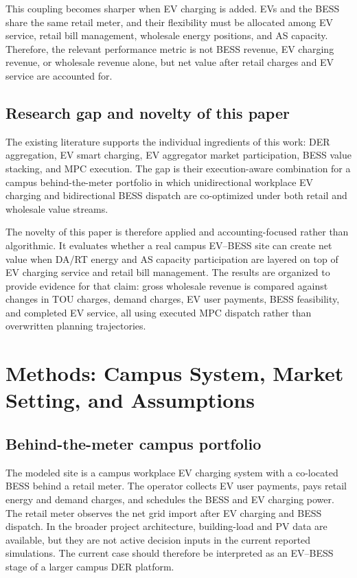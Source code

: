 \documentclass[final,5p,times]{elsarticle}
\begin{document}
This coupling becomes sharper when EV charging is added. EVs and the BESS share the same retail meter, and their flexibility must be allocated among EV service, retail bill management, wholesale energy positions, and AS capacity. Therefore, the relevant performance metric is not BESS revenue, EV charging revenue, or wholesale revenue alone, but net value after retail charges and EV service are accounted for.

\subsection{Research gap and novelty of this paper}
The existing literature supports the individual ingredients of this work: DER aggregation, EV smart charging, EV aggregator market participation, BESS value stacking, and MPC execution. The gap is their execution-aware combination for a campus behind-the-meter portfolio in which unidirectional workplace EV charging and bidirectional BESS dispatch are co-optimized under both retail and wholesale value streams.

The novelty of this paper is therefore applied and accounting-focused rather than algorithmic. It evaluates whether a real campus EV--BESS site can create net value when DA/RT energy and AS capacity participation are layered on top of EV charging service and retail bill management. The results are organized to provide evidence for that claim: gross wholesale revenue is compared against changes in TOU charges, demand charges, EV user payments, BESS feasibility, and completed EV service, all using executed MPC dispatch rather than overwritten planning trajectories.

\section{Methods: Campus System, Market Setting, and Assumptions}
\label{sec:system_description}

\subsection{Behind-the-meter campus portfolio}
The modeled site is a campus workplace EV charging system with a co-located BESS behind a retail meter. The operator collects EV user payments, pays retail energy and demand charges, and schedules the BESS and EV charging power. The retail meter observes the net grid import after EV charging and BESS dispatch. In the broader project architecture, building-load and PV data are available, but they are not active decision inputs in the current reported simulations. The current case should therefore be interpreted as an EV--BESS stage of a larger campus DER platform.
\end{document}
